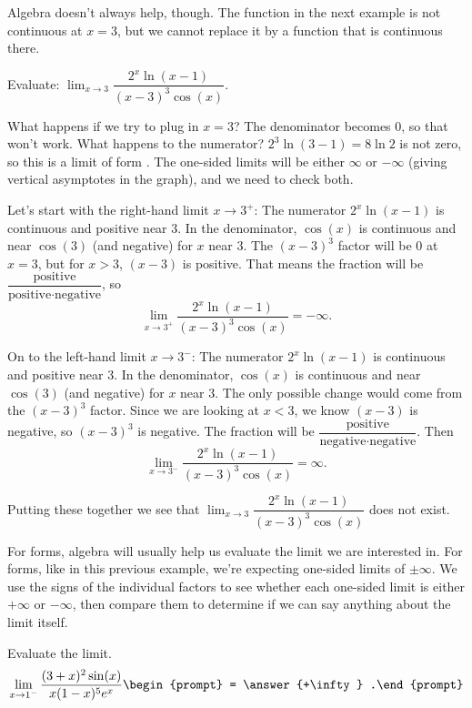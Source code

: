 \documentclass{ximera}
\begin{document}
Algebra doesn't always help, though.  The function in the next example is not continuous at $x=3$, but we cannot replace it by a function that is continuous there.
\begin{example}
	Evaluate: $\displaystyle \lim_{x\to 3} \dfrac{2^x \ln(x-1)}{(x-3)^3\cos(x)}$.
	\begin{explanation}
		What happens if we try to plug in $x=3$?  The denominator becomes $0$, so that won't work.  What happens to the numerator?
		$2^3 \ln(3-1) = 8 \ln 2$ is not zero, so this is a limit of form \numOverZero.  The one-sided limits will be either $\infty$ or $-\infty$ (giving vertical asymptotes in the graph),
		and we need to check both.
		
		Let's start with the right-hand limit $x \to 3^+$:
		The numerator $2^x \ln(x-1)$ is continuous and positive near $3$.  In the denominator, $\cos(x)$ is continuous and near $\cos(3)$ (and negative) for $x$ near $3$.
		The $(x-3)^3$ factor will be $0$ at $x=3$, but for $x > 3$, $(x-3)$ is positive.  That means the fraction will be $\dfrac{\textrm{positive}}{\textrm{positive}\cdot\textrm{negative}}$, so
		\[ \lim_{x\to 3^+} \dfrac{ 2^x \ln(x-1)}{(x-3)^3 \cos(x)} = -\infty. \]
		
		On to the left-hand limit $x \to 3^-$:
		The numerator $2^x \ln(x-1)$ is continuous and positive near $3$.  In the denominator, $\cos(x)$ is continuous and near $\cos(3)$ (and negative) for $x$ near $3$.  
		The only possible change would come from the $(x-3)^3$ factor.  Since we are looking at $x < 3$, we know $(x-3)$ is negative, so $(x-3)^3$ is negative.  The fraction
		will be $\dfrac{\textrm{positive}}{\textrm{negative}\cdot\textrm{negative}}$.  Then \[ \lim_{x\to 3^-} \dfrac{2^x \ln(x-1)}{(x-3)^3 \cos(x)} = \infty. \]
		
		Putting these together we see that $\displaystyle \lim_{x\to 3}\dfrac{ 2^x \ln(x-1)}{(x-3)^3 \cos(x)}$ does not exist.
	\end{explanation}
\end{example}
For \zeroOverZero forms, algebra will usually help us evaluate the limit we are interested in.  For \numOverZero forms, like in this previous example, we're expecting one-sided limits
of $\pm \infty$.  We use the signs of the individual factors to see whether each one-sided limit is either $+\infty$ or $-\infty$, then compare them to determine if we can say anything 
about the limit itself.

\begin{problem}
	Evaluate the limit.
	\[ \lim_{x \to 1^-} \frac{(3+x)^2 \sin(x)}{x(1-x)^5 e^x } \begin{prompt} = \answer{+\infty} .\end{prompt} \]
\end{problem}	
\end{document}
